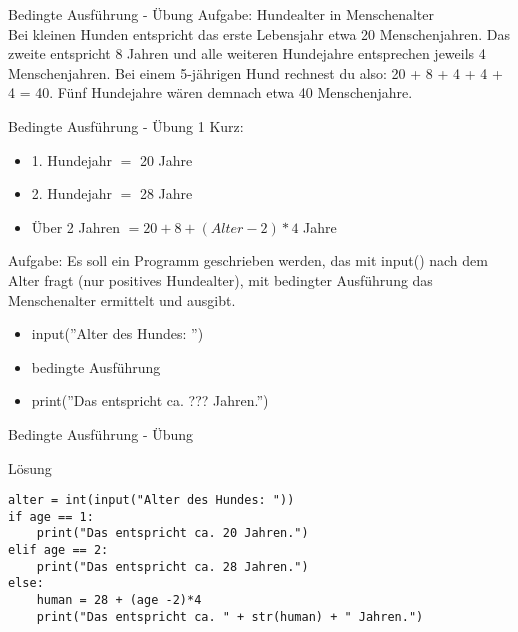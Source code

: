 \begin{frame}{Bedingte Ausführung - Übung}
Aufgabe: Hundealter in Menschenalter\\
Bei kleinen Hunden entspricht das erste Lebensjahr etwa 20 Menschenjahren. Das zweite entspricht 8 Jahren und alle weiteren Hundejahre entsprechen jeweils 4 Menschenjahren. Bei einem 5-jährigen Hund rechnest du also: 20 + 8 + 4 + 4 + 4 = 40. Fünf Hundejahre wären demnach etwa 40 Menschenjahre.\\
\end{frame}
\begin{frame}{Bedingte Ausführung - Übung 1}
Kurz:
\begin{itemize}
\item 1. Hundejahr $=$ 20 Jahre
\item 2. Hundejahr $=$ 28 Jahre
\item Über 2 Jahren $= 20 + 8 + (Alter - 2)  *  4$ Jahre
\end{itemize}
Aufgabe:
Es soll ein Programm geschrieben werden, das mit input() nach dem Alter fragt (nur positives Hundealter), mit bedingter Ausführung das Menschenalter ermittelt und ausgibt.
\begin{itemize}
	\item input(''Alter des Hundes: '')
	\item bedingte Ausführung
	\item print(''Das entspricht ca. ??? Jahren.'')
\end{itemize}

\end{frame}

\begin{frame}[fragile]{Bedingte Ausführung - Übung}
\begin{exampleblock}{Lösung}
\begin{lstlisting}
alter = int(input("Alter des Hundes: "))
if age == 1:
	print("Das entspricht ca. 20 Jahren.")
elif age == 2:
	print("Das entspricht ca. 28 Jahren.")
else:
	human = 28 + (age -2)*4
	print("Das entspricht ca. " + str(human) + " Jahren.")
\end{lstlisting}
\end{exampleblock}
\end{frame}



